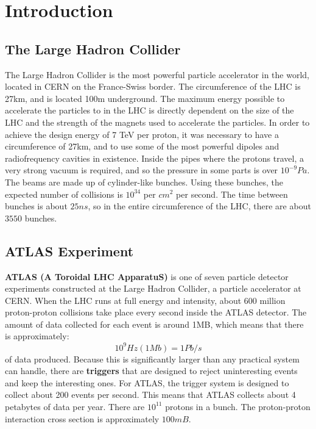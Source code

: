 \chapter{Introduction}
\section{The Large Hadron Collider}
The Large Hadron Collider is the most powerful particle accelerator in the world, located in CERN on the France-Swiss border.
The circumference of the LHC is 27km, and is located 100m underground. 
The maximum energy possible to accelerate the particles to in the LHC is directly dependent on the size of the LHC and the strength of the magnets used to accelerate the particles. 
In order to achieve the design energy of 7 TeV per proton, it was necessary to have a circumference of 27km, and to use some of the most powerful dipoles and radiofrequency cavities in existence. 
Inside the pipes where the protons travel, a very strong vacuum is required, and so the pressure in some parts is over $10^{-9}Pa$. 
The beams are made up of cylinder-like bunches. 
Using these bunches, the expected number of collisions is $10^{34}$ per $cm^2$ per second. 
The time between bunches is about $25ns$, so in the entire circumference of the LHC, there are about $3550$ bunches.
\section{ATLAS Experiment}
\textbf{ATLAS (A Toroidal LHC ApparatuS)} is one of seven particle detector experiments constructed at the Large Hadron Collider, a particle accelerator at CERN. 
When the LHC runs at full energy and intensity, about 600 million proton-proton collisions take place every second inside the ATLAS detector. 
The amount of data collected for each event is around 1MB, which means that there is approximately:
$$10^9Hz(1Mb)=1Pb/s$$
of data produced. 
Because this is significantly larger than any practical system can handle, there are \textbf{triggers} that are designed to reject uninteresting events and keep the interesting ones. 
For ATLAS, the trigger system is designed to collect about 200 events per second. 
This means that ATLAS collects about 4 petabytes of data per year. 
There are $10^{11}$ protons in a bunch. 
The proton-proton interaction cross section is approximately $100mB$.


